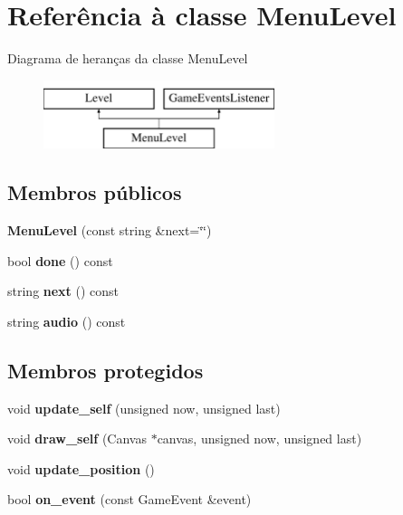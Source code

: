 \hypertarget{classMenuLevel}{}\section{Referência à classe Menu\+Level}
\label{classMenuLevel}
Diagrama de heranças da classe Menu\+Level\begin{figure}[H]
\begin{center}
\leavevmode
\includegraphics[height=2.000000cm]{classMenuLevel}
\end{center}
\end{figure}
\subsection*{Membros públicos}
\begin{DoxyCompactItemize}
\item 
\mbox{\label{classMenuLevel_a207c59fd8fdbb6252bdbbe0d8f73fcf6}} 
{\bfseries Menu\+Level} (const string \&next=\char`\"{}\char`\"{})
\item 
\mbox{\label{classMenuLevel_a2d5ce9ee9de62719ca8225509f0e53b3}} 
bool {\bfseries done} () const
\item 
\mbox{\label{classMenuLevel_ae646a2eb4d55628aef9bd9a2e0ca66d6}} 
string {\bfseries next} () const
\item 
\mbox{\label{classMenuLevel_a3293e74cafcf37c8d2b7cf79ded54d37}} 
string {\bfseries audio} () const
\end{DoxyCompactItemize}
\subsection*{Membros protegidos}
\begin{DoxyCompactItemize}
\item 
\mbox{\label{classMenuLevel_ab84aecb253d1d83b827be0eaf08a3e22}} 
void {\bfseries update\+\_\+self} (unsigned now, unsigned last)
\item 
\mbox{\label{classMenuLevel_a62ac78a0d9ddbe89ef41b9c13f8db99f}} 
void {\bfseries draw\+\_\+self} (Canvas $\ast$canvas, unsigned now, unsigned last)
\item 
\mbox{\label{classMenuLevel_abdc07d5fc61e4767f81c56b1198e848e}} 
void {\bfseries update\+\_\+position} ()
\item 
\mbox{\label{classMenuLevel_a8d450674d7c3678c7ff1f146b3e63be1}} 
bool {\bfseries on\+\_\+event} (const Game\+Event \&event)
\end{DoxyCompactItemize}
